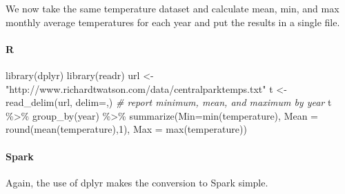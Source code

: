 \documentclass[
]{article}
\newenvironment{Shaded}{\begin{snugshade}}{\end{snugshade}}
\newcommand{\AttributeTok}[1]{\textcolor[rgb]{0.77,0.63,0.00}{#1}}
\newcommand{\CommentTok}[1]{\textcolor[rgb]{0.56,0.35,0.01}{\textit{#1}}}
\newcommand{\DecValTok}[1]{\textcolor[rgb]{0.00,0.00,0.81}{#1}}
\newcommand{\FunctionTok}[1]{\textcolor[rgb]{0.00,0.00,0.00}{#1}}
\newcommand{\NormalTok}[1]{#1}
\newcommand{\OtherTok}[1]{\textcolor[rgb]{0.56,0.35,0.01}{#1}}
\newcommand{\SpecialCharTok}[1]{\textcolor[rgb]{0.00,0.00,0.00}{#1}}
\newcommand{\StringTok}[1]{\textcolor[rgb]{0.31,0.60,0.02}{#1}}
\begin{document}
We now take the same temperature dataset and calculate mean, min, and
max monthly average temperatures for each year and put the results in a
single file.

\hypertarget{r}{%
\paragraph*{R}\label{r}}

\begin{Shaded}
\begin{Highlighting}[]
\FunctionTok{library}\NormalTok{(dplyr)}
\FunctionTok{library}\NormalTok{(readr)}
\NormalTok{url }\OtherTok{\textless{}{-}}  \StringTok{"http://www.richardtwatson.com/data/centralparktemps.txt"}
\NormalTok{t }\OtherTok{\textless{}{-}} \FunctionTok{read\_delim}\NormalTok{(url, }\AttributeTok{delim=}\StringTok{\textquotesingle{},\textquotesingle{}}\NormalTok{)}
\CommentTok{\# report minimum, mean, and maximum by year}
\NormalTok{t }\SpecialCharTok{\%\textgreater{}\%} 
  \FunctionTok{group\_by}\NormalTok{(year) }\SpecialCharTok{\%\textgreater{}\%}
  \FunctionTok{summarize}\NormalTok{(}\AttributeTok{Min=}\FunctionTok{min}\NormalTok{(temperature),}
            \AttributeTok{Mean =} \FunctionTok{round}\NormalTok{(}\FunctionTok{mean}\NormalTok{(temperature),}\DecValTok{1}\NormalTok{), }
            \AttributeTok{Max =} \FunctionTok{max}\NormalTok{(temperature))}
\end{Highlighting}
\end{Shaded}

\hypertarget{spark-2}{%
\paragraph*{Spark}\label{spark-2}}

Again, the use of dplyr makes the conversion to Spark simple.
\end{document}

